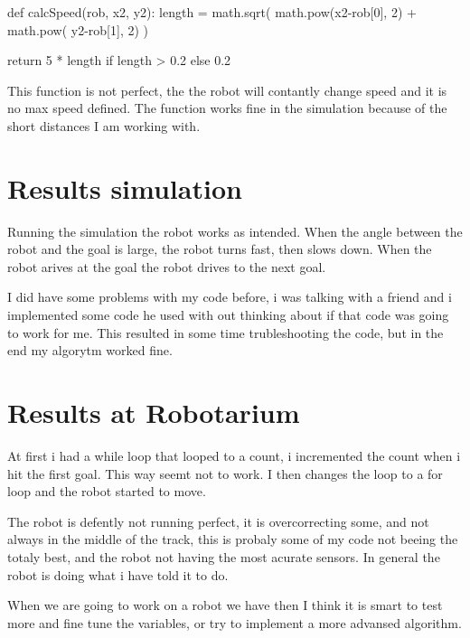 \documentclass{article}
\begin{document}
        \begin{pythoncode}
    def calcSpeed(rob, x2, y2):
        length = math.sqrt( math.pow(x2-rob[0], 2) + 
            math.pow( y2-rob[1], 2) )

        return 5 * length if length > 0.2 else 0.2
        \end{pythoncode}

        This function is not perfect, the the robot will contantly change speed and it is no max speed defined. The function works fine in the simulation because of the short distances I am working with.

    \section{Results simulation}
        Running the simulation the robot works as intended. When the angle between the robot and the goal is large, the robot turns fast, then slows down. When the robot arives at the goal the robot drives to the next goal. 
        
        I did have some problems with my code before, i was talking with a friend and i implemented some code he used with out thinking about if that code was going to work for me. This resulted in some time trubleshooting the code, but in the end my algorytm worked fine.

    \section{Results at Robotarium}
        At first i had a while loop that looped to a count, i incremented the count when i hit the first goal. This way seemt not to work. I then changes the loop to a for loop and the robot started to move.

        The robot is defently not running perfect, it is overcorrecting some, and not always in the middle of the track, this is probaly some of my code not beeing the totaly best, and the robot not having the most acurate sensors. In general the robot is doing what i have told it to do.

        When we are going to work on a robot we have then I think it is smart to test more and fine tune the variables, or try to implement a more advansed algorithm.
\end{document}
